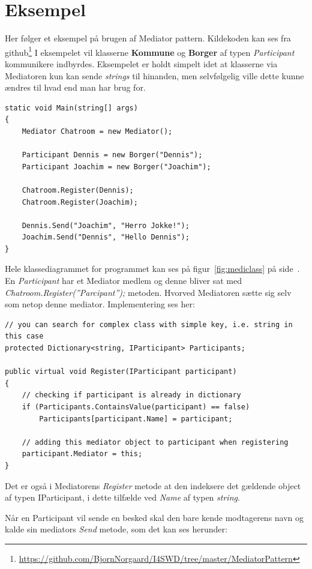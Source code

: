 \section{Eksempel}
Her følger et eksempel på brugen af Mediator pattern. Kildekoden kan ses fra github\footnote{\url{https://github.com/BjornNorgaard/I4SWD/tree/master/MediatorPattern}} I eksempelet vil klasserne \textbf{Kommune} og \textbf{Borger} af typen \textit{Participant} kommunikere indbyrdes. Eksempelet er holdt simpelt idet at klasserne via Mediatoren kun kan sende \textit{strings} til hinanden, men selvfølgelig ville dette kunne ændres til hvad end man har brug for.

\begin{lstlisting}
static void Main(string[] args)
{
	Mediator Chatroom = new Mediator();
	
	Participant Dennis = new Borger("Dennis");
	Participant Joachim = new Borger("Joachim");
	
	Chatroom.Register(Dennis);
	Chatroom.Register(Joachim);
	
	Dennis.Send("Joachim", "Herro Jokke!");
	Joachim.Send("Dennis", "Hello Dennis");
}
\end{lstlisting}

Hele klassediagrammet for programmet kan ses på figur~\ref{fig:mediclass} på side~\pageref{fig:mediclass}. En \textit{Participant} har et Mediator medlem og denne bliver sat med \textit{Chatroom.Register(''Parcipant'');} metoden. Hvorved Mediatoren sætte sig selv som netop denne mediator. Implementering ses her:

\begin{lstlisting}
// you can search for complex class with simple key, i.e. string in this case
protected Dictionary<string, IParticipant> Participants;

public virtual void Register(IParticipant participant)
{
	// checking if participant is already in dictionary
	if (Participants.ContainsValue(participant) == false)
		Participants[participant.Name] = participant;
	
	// adding this mediator object to participant when registering
	participant.Mediator = this;
}
\end{lstlisting}

Det er også i Mediatorens \textit{Register} metode at den indeksere det gældende object af typen IParticipant, i dette tilfælde ved \textit{Name} af typen \textit{string}. 

Når en Participant vil sende en besked skal den bare kende modtagerens navn og kalde sin mediators \textit{Send} metode, som det kan ses herunder:

